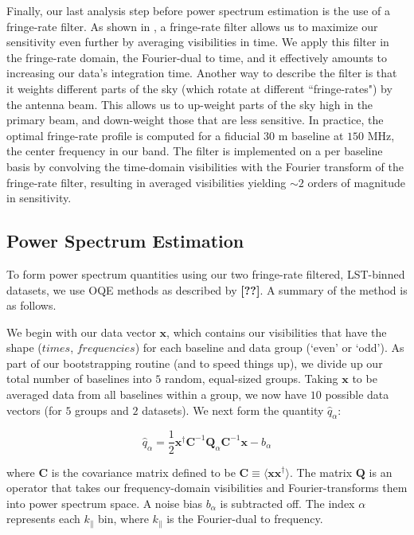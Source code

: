 \documentclass[preprint2,numberedappendix,tighten,twocolappendix]{aastex6}  %
\newcommand{\cc}[1]{{\color{purple} \textbf{[#1]}}}
\begin{document}
Finally, our last analysis step before power spectrum estimation is the use of a fringe-rate filter. As shown in \citet{parsons_et_al2016}, a fringe-rate filter allows us to maximize our sensitivity even further by averaging visibilities in time. We apply this filter in the fringe-rate domain, the Fourier-dual to time, and it effectively amounts to increasing our data's integration time. Another way to describe the filter is that it weights different parts of the sky (which rotate at different ``fringe-rates") by the antenna beam. This allows us to up-weight parts of the sky high in the primary beam, and down-weight those that are less sensitive. In practice, the optimal fringe-rate profile is computed for a fiducial $30$ m baseline at $150$ MHz, the center frequency in our band. The filter is implemented on a per baseline basis by convolving the time-domain visibilities with the Fourier transform of the fringe-rate filter, resulting in averaged visibilities yielding $\sim 2$ orders of magnitude in sensitivity. 

\subsection{Power Spectrum Estimation}
\label{sec:PS}

To form power spectrum quantities using our two fringe-rate filtered, LST-binned datasets, we use OQE methods as described by \cc{??}. A summary of the method is as follows. 

We begin with our data vector $\textbf{x}$, which contains our visibilities that have the shape ($times$, $frequencies$) for each baseline and data group (`even' or `odd'). As part of our bootstrapping routine (and to speed things up), we divide up our total number of baselines into $5$ random, equal-sized groups. Taking $\textbf{x}$ to be averaged data from all baselines within a group, we now have $10$ possible data vectors (for $5$ groups and $2$ datasets). We next form the quantity $\hat{q}_{\alpha}$:

\begin{equation}
\hat{q}_{\alpha} = \frac{1}{2}\textbf{x}^{\dagger}\textbf{C}^{-1}\textbf{Q}_{\alpha}\textbf{C}^{-1}\textbf{x}-b_{\alpha}
\end{equation}

where $\textbf{C}$ is the covariance matrix defined to be $\textbf{C} \equiv \langle\textbf{x}\textbf{x}^{\dagger}\rangle$. The matrix $\textbf{Q}$ is an operator that takes our frequency-domain visibilities and Fourier-transforms them into power spectrum space. A noise bias $b_{\alpha}$ is subtracted off. The index $\alpha$ represents each $k_{\parallel}$ bin, where $k_{\parallel}$ is the Fourier-dual to frequency.
\end{document}
